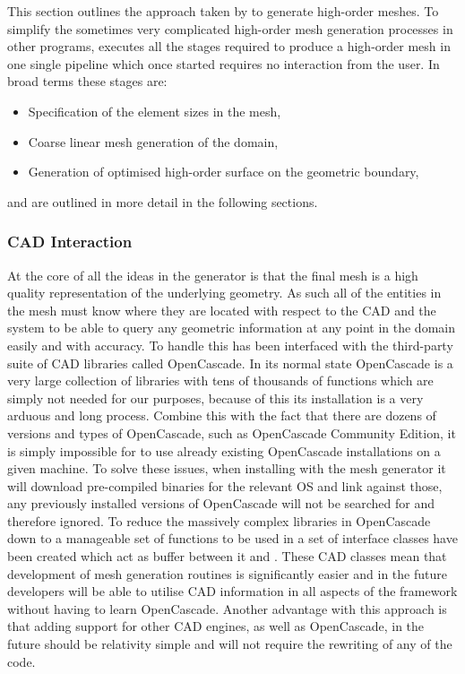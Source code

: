 This section outlines the approach taken by \nm to generate high-order meshes.
%
To simplify the sometimes very complicated high-order mesh generation processes
in other programs, \nm executes all the stages required to produce a high-order
mesh in one single pipeline which once started requires no interaction from the
user. In broad terms these stages are:
\begin{itemize}
	\item Specification of the element sizes in the mesh,
	\item Coarse linear mesh generation of the domain,
	\item Generation of optimised high-order surface on the geometric boundary,
\end{itemize}
%
and are outlined in more detail in the following sections.

\subsubsection{CAD Interaction}

At the core of all the ideas in the \nm generator is that the final mesh is a
high quality representation of the underlying geometry. As such all of the
entities in the mesh must know where they are located with respect to the CAD
and the system to be able to query any geometric information at any point in the
domain easily and with accuracy. To handle this \nm has been interfaced with the
third-party suite of CAD libraries called OpenCascade. In its normal state
OpenCascade is a very large collection of libraries with tens of thousands of
functions which are simply not needed for our purposes, because of this its
installation is a very arduous and long process. Combine this with the fact that
there are dozens of versions and types of OpenCascade, such as OpenCascade
Community Edition, it is simply impossible for \nm to use already existing
OpenCascade installations on a given machine. To solve these issues, when
installing \nekpp with the mesh generator it will download pre-compiled binaries
for the relevant OS and link against those, any previously installed versions of
OpenCascade will not be searched for and therefore ignored.
%
To reduce the massively complex libraries in OpenCascade down to a manageable
set of functions to be used in \nm a set of interface classes have been created
which act as buffer between it and \nekpp. These CAD classes mean that
development of mesh generation routines is significantly easier and in the
future \nekpp developers will be able to utilise CAD information in all aspects
of the framework without having to learn OpenCascade. Another advantage with
this approach is that adding support for other CAD engines, as well as
OpenCascade, in the future should be relativity simple and will not require the
rewriting of any of the \nm code.

